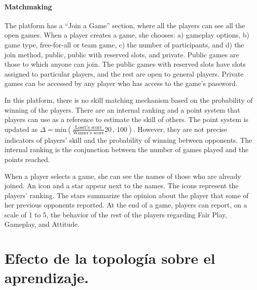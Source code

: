 \documentclass[a4paper,10pt]{book}
\theoremstyle{definition}
\begin{document}
\subsubsection*{Matchmaking}

The platform has a ``Join a Game'' section, where all the players can see all the open games.
When a player creates a game, she chooses: a) gameplay options, b) game type, free-for-all or team game, c) the number of participants, and d) the join method, public, public with reserved slots, and private.
Public games are those to which anyone can join.
The public games with reserved slots have slots assigned to particular players, and the rest are open to general players.
Private games can be accessed by any player who has access to the game's password.

In this platform, there is no skill matching mechanism based on the probability of winning of the players.
There are an internal ranking and a point system that players can use as a reference to estimate the skill of others.
The point system is updated as {\small $\Delta = \text{min}(\frac{\text{Loser's score}}{\text{Winner's score}}20\,,\,100 )$}.
However, they are not precise indicators of players' skill and the probability of winning between opponents.
The internal ranking is the conjunction between the number of games played and the points reached.

When a player selects a game, she can see the names of those who are already joined.
An icon and a star appear next to the names.
The icons represent the players' ranking.
The stars summarize the opinion about the player that some of her previous opponents reported.
At the end of a game, players can report, on a scale of 1 to 5, the behavior of the rest of the players regarding Fair Play, Gameplay, and Attitude.


\chapter{Efecto de la topología sobre el aprendizaje.} \label{ch:topo}
\end{document}
